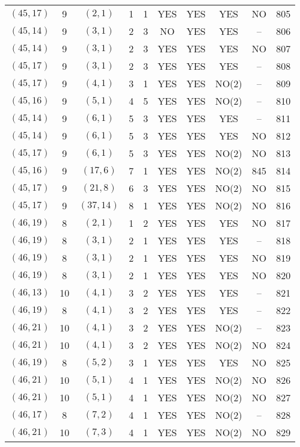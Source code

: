 \begin{longtable}{|c|c|c|c|c|c|c|c|c|c|}
$(45, 17)$ & 9 & $(2, 1)$ & 1 & 1 & YES & YES & YES & NO & 805\\
$(45, 14)$ & 9 & $(3, 1)$ & 2 & 3 & NO & YES & YES & -- & 806\\
$(45, 14)$ & 9 & $(3, 1)$ & 2 & 3 & YES & YES & YES & NO & 807\\
$(45, 17)$ & 9 & $(3, 1)$ & 2 & 3 & YES & YES & YES & -- & 808\\
$(45, 17)$ & 9 & $(4, 1)$ & 3 & 1 & YES & YES & NO(2) & -- & 809\\
$(45, 16)$ & 9 & $(5, 1)$ & 4 & 5 & YES & YES & NO(2) & -- & 810\\
$(45, 14)$ & 9 & $(6, 1)$ & 5 & 3 & YES & YES & YES & -- & 811\\
$(45, 14)$ & 9 & $(6, 1)$ & 5 & 3 & YES & YES & YES & NO & 812\\
$(45, 17)$ & 9 & $(6, 1)$ & 5 & 3 & YES & YES & NO(2) & NO & 813\\
$(45, 16)$ & 9 & $(17, 6)$ & 7 & 1 & YES & YES & NO(2) & 845 & 814\\
$(45, 17)$ & 9 & $(21, 8)$ & 6 & 3 & YES & YES & NO(2) & NO & 815\\
$(45, 17)$ & 9 & $(37, 14)$ & 8 & 1 & YES & YES & NO(2) & NO & 816\\
$(46, 19)$ & 8 & $(2, 1)$ & 1 & 2 & YES & YES & YES & NO & 817\\
$(46, 19)$ & 8 & $(3, 1)$ & 2 & 1 & YES & YES & YES & -- & 818\\
$(46, 19)$ & 8 & $(3, 1)$ & 2 & 1 & YES & YES & YES & NO & 819\\
$(46, 19)$ & 8 & $(3, 1)$ & 2 & 1 & YES & YES & YES & NO & 820\\
$(46, 13)$ & 10 & $(4, 1)$ & 3 & 2 & YES & YES & YES & -- & 821\\
$(46, 19)$ & 8 & $(4, 1)$ & 3 & 2 & YES & YES & YES & -- & 822\\
$(46, 21)$ & 10 & $(4, 1)$ & 3 & 2 & YES & YES & NO(2) & -- & 823\\
$(46, 21)$ & 10 & $(4, 1)$ & 3 & 2 & YES & YES & NO(2) & NO & 824\\
$(46, 19)$ & 8 & $(5, 2)$ & 3 & 1 & YES & YES & YES & NO & 825\\
$(46, 21)$ & 10 & $(5, 1)$ & 4 & 1 & YES & YES & NO(2) & NO & 826\\
$(46, 21)$ & 10 & $(5, 1)$ & 4 & 1 & YES & YES & NO(2) & NO & 827\\
$(46, 17)$ & 8 & $(7, 2)$ & 4 & 1 & YES & YES & NO(2) & -- & 828\\
$(46, 21)$ & 10 & $(7, 3)$ & 4 & 1 & YES & YES & NO(2) & NO & 829\\

\end{longtable}
